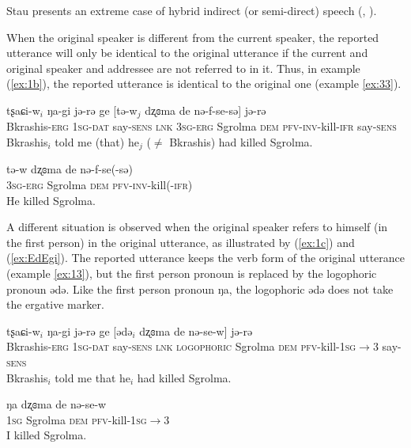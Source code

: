 \documentclass[oneside,a4paper,11pt]{article}
\newcommand{\ipa}[1]{{\phon#1}} %
\newcommand{\ipapl}[1]{{\phon#1}} %
\newcommand{\dat}{\textsc{dat}}
\newcommand{\dem}{\textsc{dem}}
\newcommand{\evid}{\textsc{ifr}}
\newcommand{\erg}{\textsc{erg}}
\newcommand{\inv}{\textsc{inv}}
\newcommand{\prf}{\textsc{pfv}}
\newcommand{\sg}{\textsc{sg}}
\newcommand{\sens}{\textsc{sens}}
\begin{document}
Stau presents an extreme case of hybrid indirect (or semi-direct)  speech  (\citealt{aikhenvald08semidirect}, \citealt{tournadre08conjunct}). 

When the original speaker is different from the current speaker, the reported utterance will only be identical to the original utterance if the current and original speaker and addressee are not referred to in it. Thus, in example (\ref{ex:1b}), the reported utterance is identical to the original one (example \ref{ex:33}).


\begin{exe}
\ex \label{ex:1b}
\gll
	\ipa{tʂaɕi-w}$_i$ \ipa{ŋa-gi}	\ipa{jə-rə} \ipa{ge} [\ipapl{tə-w}$_j$	\ipapl{dʐɞma} 	\ipapl{de} \ipapl{nə-f-se-sə}] \ipa{jə-rə}  \\
	{Bkrashis-\erg} {1\sg-\dat} {say-\sens} \textsc{lnk} {3\sg-\erg} Sgrolma {\dem} {\prf-\inv-kill-\evid}  say-\sens\\ 
	\glt Bkrashis$_i$ told me (that) he$_j$ ($\ne$ Bkrashis) had killed Sgrolma.
\end{exe}


\begin{exe}
\ex \label{ex:33}
\gll
	\ipa{tə-w} \ipapl{dʐɞma} \ipapl{de} \ipapl{nə-f-se(-sə)} \\
	{3\sg-\erg} Sgrolma {\dem} {\prf-\inv-kill(-\evid)}\\ 
	\glt He killed Sgrolma.
\end{exe}

A different situation is observed when the original speaker refers to himself (in the first person) in the original utterance, as illustrated by (\ref{ex:1c}) and (\ref{ex:EdEgi}).  The reported utterance keeps the verb form of the original utterance (example \ref{ex:13}), but the first person pronoun is replaced by the logophoric pronoun \ipa{ədə}. Like the first person pronoun \ipa{ŋa}, the logophoric \ipa{ədə} does not take the ergative marker.

\begin{exe}
\ex \label{ex:1c}
\gll
	\ipa{tʂaɕi-w}$_i$ \ipa{ŋa-gi}	\ipa{jə-rə} \ipa{ge} [\ipapl{ədə}$_i$	\ipapl{dʐɞma} 	\ipapl{de} 	\ipapl{nə-se-w}] \ipa{jə-rə}  \\
	{Bkrashis-\erg} {1\sg-\dat} {say-\sens} \textsc{lnk} \textsc{logophoric} Sgrolma {\dem} {\prf-kill-1\sg$\rightarrow$3} say-\sens\\ 
	\glt Bkrashis$_i$ told me that he$_i$ had killed Sgrolma.
\end{exe}


\begin{exe}
\ex \label{ex:13}
\gll
	\ipa{ŋa}	\ipapl{dʐɞma} 	\ipapl{de} 	\ipapl{nə-se-w} \\
	{1\sg} Sgrolma {\dem} {\prf-kill-1\sg$\rightarrow$3}\\ 
	\glt I killed Sgrolma.
\end{exe}
\end{document}
